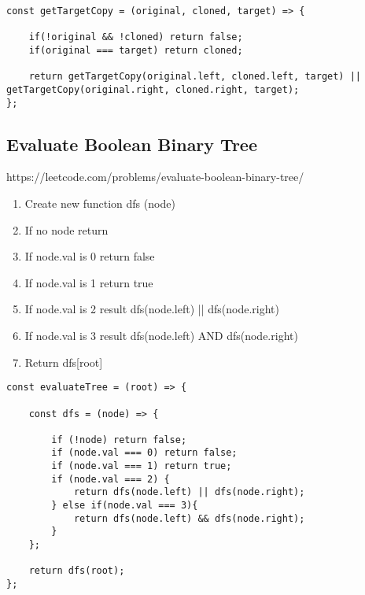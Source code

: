\documentclass[10pt]{article}
\begin{document}
\begin{lstlisting}[title=Solution getTargetCopy, captionpos=t]
const getTargetCopy = (original, cloned, target) => {
    
    if(!original && !cloned) return false;
    if(original === target) return cloned;
    
    return getTargetCopy(original.left, cloned.left, target) || getTargetCopy(original.right, cloned.right, target);
};
\end{lstlisting}

\medskip %





\pagebreak
\medskip   
\subsection{Evaluate Boolean Binary Tree}
https://leetcode.com/problems/evaluate-boolean-binary-tree/

\begin{enumerate}
	\item Create new function dfs (node)
	\item If no node return
	\item If node.val is 0 return false
	\item If node.val is 1 return true
	\item If node.val is 2 result dfs(node.left) || dfs(node.right)
	\item If node.val is 3 result dfs(node.left) AND dfs(node.right)
	\item Return dfs[root]

\end{enumerate}

\begin{lstlisting}[title=Solution evaluateTree, captionpos=t]
const evaluateTree = (root) => {
    
    const dfs = (node) => {
        
        if (!node) return false; 
        if (node.val === 0) return false;
        if (node.val === 1) return true;
        if (node.val === 2) {
            return dfs(node.left) || dfs(node.right);
        } else if(node.val === 3){
            return dfs(node.left) && dfs(node.right);
        }
    };
    
    return dfs(root);
};
\end{lstlisting}

\medskip %
\end{document}
